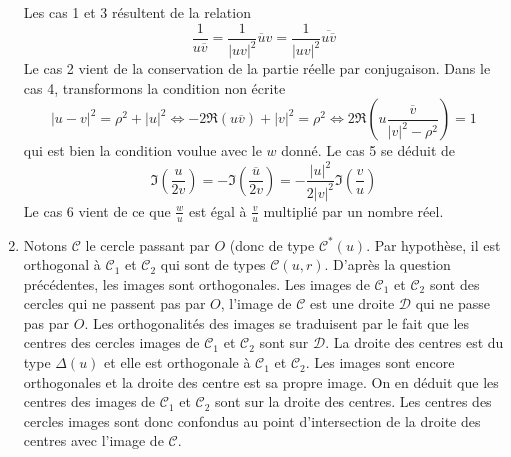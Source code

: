 \begin{enumerate}
Les cas 1 et 3 résultent de la relation
\begin{displaymath}
  \frac{1}{u\overline{v}} = \frac{1}{|uv|^2}\overline{u}v = \frac{1}{|uv|^2}\overline{u\overline{v}}
\end{displaymath}
Le cas 2 vient de la conservation de la partie réelle par conjugaison.\newline
Dans le cas 4, transformons la condition non écrite
\begin{displaymath}
  |u - v|^2 = \rho^2 + |u|^2 \Leftrightarrow -2\Re\left(u\overline{v}\right) + |v|^2 = \rho^2 
  \Leftrightarrow 2\Re\left(u\frac{\overline{v}}{|v|^2 - \rho^2}\right) = 1
\end{displaymath}
qui est bien la condition voulue avec le $w$ donné.\newline
Le cas 5 se déduit de
\begin{displaymath}
  \Im\left(\frac{u}{2v}\right) = -\Im\left(\overline{\frac{u}{2v}}\right) = 
  -\frac{|u|^2}{2|v|^2}\Im\left(\frac{v}{u}\right) 
\end{displaymath}
Le cas 6 vient de ce que $\frac{w}{u}$ est égal à $\frac{v}{u}$ multiplié par un nombre réel.

\item Notons $\mathcal C$ le cercle passant par $O$ (donc de type $\mathcal C^*(u)$.\newline
Par hypothèse, il est orthogonal à $\mathcal C_1$ et $\mathcal C_2$ qui sont de types $\mathcal C(u,r)$. D'après la question précédentes, les images sont orthogonales. Les images de $\mathcal C_1$ et $\mathcal C_2$ sont des cercles qui ne passent pas par $O$, l'image de $\mathcal C$ est une droite $\mathcal D$ qui ne passe pas par $O$. Les orthogonalités des images se traduisent par le fait que les centres des cercles images de $\mathcal C_1$ et $\mathcal C_2$ sont sur $\mathcal D$.\newline
La droite des centres est du type $\Delta (u)$ et elle est orthogonale à $\mathcal C_1$ et $\mathcal C_2$. Les images sont encore orthogonales et la droite des centre est sa propre image. On en déduit que les centres des images de $\mathcal C_1$ et $\mathcal C_2$ sont sur la droite des centres.\newline
Les centres des cercles images sont donc confondus au point d'intersection de la droite des centres avec l'image de $\mathcal C$.
\end{enumerate}

